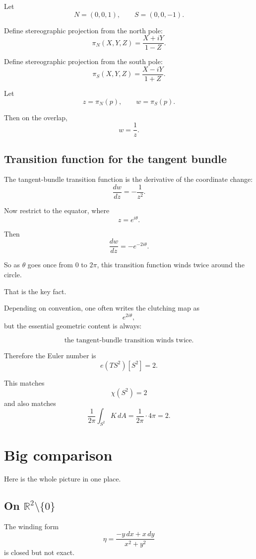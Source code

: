 \documentclass[11pt]{article}
\begin{document}
	Let
	\[
	N=(0,0,1),\qquad S=(0,0,-1).
	\]
	
	Define stereographic projection from the north pole:
	\[
	\pi_N(X,Y,Z)=\frac{X+iY}{1-Z}.
	\]
	
	Define stereographic projection from the south pole:
	\[
	\pi_S(X,Y,Z)=\frac{X-iY}{1+Z}.
	\]
	
	Let
	\[
	z=\pi_N(p),\qquad w=\pi_S(p).
	\]
	
	Then on the overlap,
	\[
	w=\frac{1}{z}.
	\]
	
	\subsection{Transition function for the tangent bundle}
	
	The tangent-bundle transition function is the derivative of the coordinate change:
	\[
	\frac{dw}{dz}=-\frac{1}{z^2}.
	\]
	
	Now restrict to the equator, where
	\[
	z=e^{i\theta}.
	\]
	
	Then
	\[
	\frac{dw}{dz}=-e^{-2i\theta}.
	\]
	
	So as \(\theta\) goes once from \(0\) to \(2\pi\), this transition function winds twice around the circle.
	
	That is the key fact.
	
	Depending on convention, one often writes the clutching map as
	\[
	e^{2i\theta},
	\]
	but the essential geometric content is always:
	
	\[
	\boxed{\text{the tangent-bundle transition winds twice}.}
	\]
	
	Therefore the Euler number is
	\[
	e(TS^2)[S^2]=2.
	\]
	
	This matches
	\[
	\chi(S^2)=2
	\]
	and also matches
	\[
	\frac{1}{2\pi}\int_{S^2}K\,dA
	=
	\frac{1}{2\pi}\cdot 4\pi
	=
	2.
	\]
	
	\section{Big comparison}
	
	Here is the whole picture in one place.
	
	\subsection*{On \(\mathbb{R}^2\setminus\{0\}\)}
	
	The winding form
	\[
	\eta=\frac{-y\,dx+x\,dy}{x^2+y^2}
	\]
	is closed but not exact.
	
\end{document}
